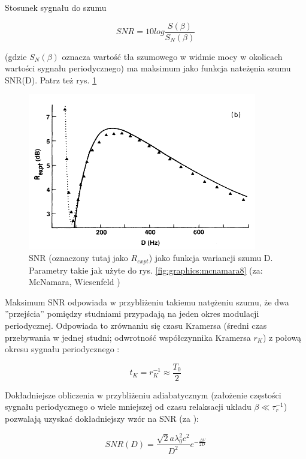   Stosunek sygnału do szumu

  \begin{equation} \label{sr:snr}
    SNR = 10 log \frac{S(\beta)}{S_N(\beta)}
  \end{equation}

  (gdzie $S_N(\beta)$ oznacza wartość tła szumowego w widmie mocy w okolicach wartości sygnału periodycznego) ma maksimum jako funkcja nateżęnia szumu SNR(D). Patrz też rys. \ref{fig:graphics:mcnamara9b}

  \begin{figure}
    \includegraphics[width=100mm]{images/mcnamara_9b.png}
    \caption{SNR (oznaczony tutaj jako $R_{expt}$) jako funkcja wariancji szumu D. Parametry takie jak użyte do rys. \ref{fig:graphics:mcnamara8} (za: McNamara, Wiesenfeld \cite{mcnamara})}
    \label{fig:graphics:mcnamara9b}
  \end{figure}

  Maksimum SNR odpowiada w przybliżeniu takiemu natężeniu szumu, że dwa ''przejścia'' pomiędzy studniami przypadają na jeden okres modulacji periodycznej. Odpowiada to zrównaniu się czasu Kramersa (średni czas przebywania w jednej studni; odwrotność współczynnika Kramersa $r_K$) z połową okresu sygnału periodycznego \cite{fauve}:

  \begin{equation} \label{sr:kramers}
    t_K = r_{K}^{-1} \approx \frac{T_0}{2}
  \end{equation}  

  Dokładniejsze obliczenia w przybliżeniu adiabatycznym (założenie częstości sygnału periodycznego o wiele mniejszej od czasu relaksacji układu $\beta \ll \tau^{-1}_r$) pozwalają uzyskać dokładniejszy wzór na SNR (za \cite{mcnamara}):

  \begin{equation} \label{sr:snr_theoretical}
    SNR(D) = \frac{\sqrt{2}a \lambda^{2}_0 c^2}{D^2} e^{-\frac{\Delta V}{2D}}
  \end{equation}

